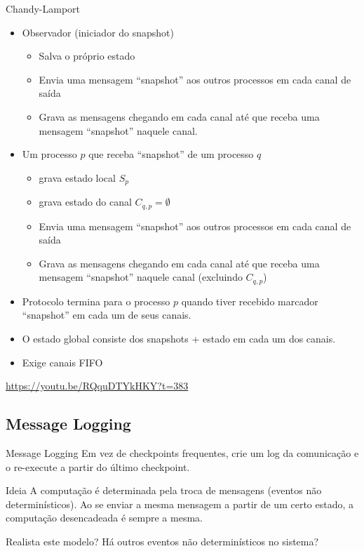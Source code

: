 \begin{frame}{Chandy-Lamport}
	\begin{itemize}
		\item Observador (iniciador do snapshot)
		\begin{itemize}
			\item Salva o próprio estado
			\item Envia uma mensagem ``snapshot'' aos outros processos em cada canal de saída
			\item Grava as mensagens chegando em cada canal até que receba uma mensagem ``snapshot'' naquele canal.
		\end{itemize}
		\item Um processo $p$ que receba ``snapshot'' de um processo $q$
		\begin{itemize}
			\item grava estado local $S_p$
			\item grava estado do canal $C_{q,p} =\emptyset$
			\item Envia uma mensagem ``snapshot'' aos outros processos em cada canal de saída
			\item Grava as mensagens chegando em cada canal até que receba uma mensagem ``snapshot'' naquele canal (excluindo $C_{q,p}$)
		\end{itemize}
		\item Protocolo termina para o processo $p$ quando tiver recebido marcador ``snapshot'' em cada um de seus canais.
		\item O estado global consiste dos snapshots + estado em cada um dos canais.
		\pause \item Exige canais FIFO
	\end{itemize}
	
	\url{https://youtu.be/RQquDTYkHKY?t=383}
\end{frame}


\subsection{Message Logging}
\begin{frame}{Message Logging}
	Em vez de checkpoints frequentes, crie um log da comunicação e o re-execute a partir do último checkpoint.
	
	\begin{block}{Ideia}
		A computação é determinada pela troca de mensagens (eventos não determinísticos). 
		Ao se enviar a mesma mensagem a partir de um certo estado, a computação desencadeada é sempre a mesma.
	\end{block}
	
	\pause Realista este modelo? Há outros eventos não determinísticos no sistema?
\end{frame}

